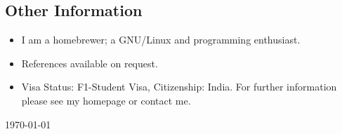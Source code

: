 \documentclass[letterpaper, 11pt]{article}
\begin{document}
	\subsection{Other Information}
	\begin{itemize}
		\item I am a homebrewer; a GNU/Linux and programming enthusiast.
		\item References available on request.
		\item Visa Status: F1-Student Visa, Citizenship: India. For further
		information please see my homepage or contact me.
	\end{itemize}
	\begin{center}
		\today{}
	\end{center}
	
\end{document}
